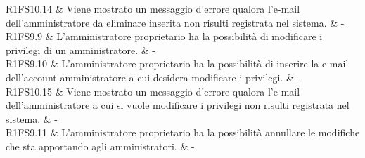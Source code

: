 R1FS10.14 & Viene mostrato un messaggio d'errore qualora l'e-mail dell'amministratore da eliminare inserita non risulti registrata nel sistema.  & - \\

R1FS9.9 & L'amministratore proprietario ha la possibilità di modificare i privilegi di un amministratore.  & - \\

R1FS9.10 & L'amministratore proprietario ha la possibilità di inserire la e-mail dell'account amministratore a cui desidera modificare i privilegi.  & - \\

R1FS10.15 & Viene mostrato un messaggio d'errore qualora l'e-mail dell'amministratore a cui si vuole modificare i privilegi non risulti registrata nel sistema.  & - \\

R1FS9.11 & L'amministratore proprietario ha la possibilità annullare le modifiche che sta apportando agli amministratori.  & - \\
